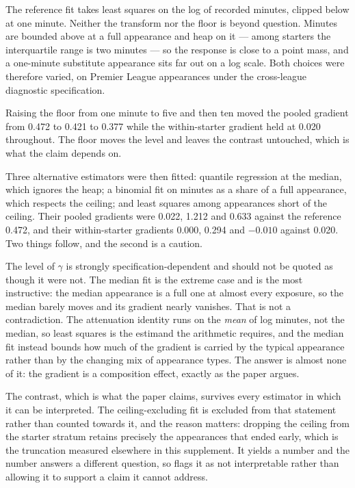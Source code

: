 \documentclass[11pt]{article}
\begin{document}
The reference fit takes least squares on the log of recorded minutes, clipped below at one minute. Neither the transform nor the floor is beyond question. Minutes are bounded above at a full appearance and heap on it --- among starters the interquartile range is two minutes --- so the response is close to a point mass, and a one-minute substitute appearance sits far out on a log scale. Both choices were therefore varied, on Premier League appearances under the cross-league diagnostic specification.

Raising the floor from one minute to five and then ten moved the pooled gradient from 0.472 to 0.421 to 0.377 while the within-starter gradient held at 0.020 throughout. The floor moves the level and leaves the contrast untouched, which is what the claim depends on.

Three alternative estimators were then fitted: quantile regression at the median, which ignores the heap; a binomial fit on minutes as a share of a full appearance, which respects the ceiling; and least squares among appearances short of the ceiling. Their pooled gradients were 0.022, 1.212 and 0.633 against the reference 0.472, and their within-starter gradients 0.000, 0.294 and $-0.010$ against 0.020. Two things follow, and the second is a caution.

The level of $\gamma$ is strongly specification-dependent and should not be quoted as though it were not. The median fit is the extreme case and is the most instructive: the median appearance is a full one at almost every exposure, so the median barely moves and its gradient nearly vanishes. That is not a contradiction. The attenuation identity runs on the \emph{mean} of log minutes, not the median, so least squares is the estimand the arithmetic requires, and the median fit instead bounds how much of the gradient is carried by the typical appearance rather than by the changing mix of appearance types. The answer is almost none of it: the gradient is a composition effect, exactly as the paper argues.

The contrast, which is what the paper claims, survives every estimator in which it can be interpreted. The ceiling-excluding fit is excluded from that statement rather than counted towards it, and the reason matters: dropping the ceiling from the starter stratum retains precisely the appearances that ended early, which is the truncation measured elsewhere in this supplement. It yields a number and the number answers a different question, so  flags it as not interpretable rather than allowing it to support a claim it cannot address.
\end{document}
